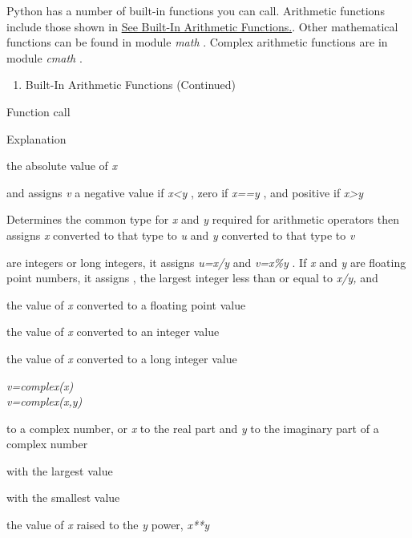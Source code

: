 Python has a number of built-in
functions you can call. Arithmetic functions include those shown in
\href{chap2.html\#32777}{See Built-In Arithmetic Functions.}. Other
mathematical functions can be found in module \emph{math} . Complex
arithmetic functions are in module \emph{cmath} .

\begin{enumerate}
\tightlist
\item
  Built-In Arithmetic Functions (Continued)
\end{enumerate}

Function call

Explanation



 the absolute
value of \emph{x}



 and
assigns \emph{v} a negative value if \emph{x\textless{}y} , zero if
\emph{x==y} , and positive if \emph{x\textgreater{}y}



Determines the common type for
\emph{x} and \emph{y} required for arithmetic operators then assigns
\emph{x} converted to that type to \emph{u} and \emph{y} converted to
that type to \emph{v}



 are
integers or long integers, it assigns \emph{u=x/y} and \emph{v=x\%y} .
If \emph{x} and \emph{y} are floating point numbers, it assigns
, the largest integer less than or equal
to \emph{x/y,} and



 the value of
\emph{x} converted to a floating point value



 the value of
\emph{x} converted to an integer value



 the value of
\emph{x} converted to a long integer value

 \emph{v=complex(x)\\
v=complex(x,y)}

 to a complex
number, or \emph{x} to the real part and \emph{y} to the imaginary part
of a complex number



 with
the largest value



 with
the smallest value



 the value of
\emph{x} raised to the \emph{y} power, \emph{x**y}



